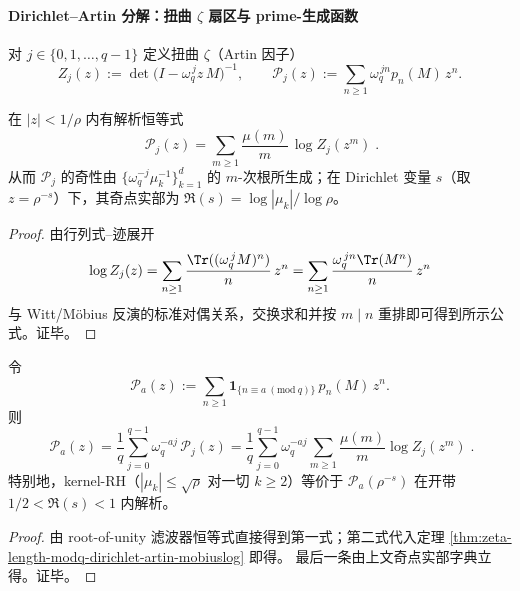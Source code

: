 \paragraph{Dirichlet--Artin 分解：扭曲 \texorpdfstring{$\zeta$}{zeta} 扇区与 prime-生成函数}
对 \(j\in\{0,1,\dots,q-1\}\) 定义扭曲 \(\zeta\)（Artin 因子）
\[
Z_j(z):=\det\bigl(I-\omega_q^{\,j}z\,M\bigr)^{-1},
\qquad
\mathcal{P}_j(z):=\sum_{n\ge1}\omega_q^{\,jn}p_n(M)\,z^n.
\]

\begin{theorem}\label{thm:zeta-length-modq-dirichlet-artin-mobiuslog}
在 \(|z|<1/\rho\) 内有解析恒等式
\[
\boxed{\;
\mathcal{P}_j(z)=\sum_{m\ge1}\frac{\mu(m)}{m}\,\log Z_j(z^m)\; }.
\]
从而 \(\mathcal{P}_j\) 的奇性由 \(\{\omega_q^{-j}\mu_k^{-1}\}_{k=1}^d\) 的 \(m\)-次根所生成；在 Dirichlet 变量 \(s\)（取 \(z=\rho^{-s}\)）下，其奇点实部为
\(
\Re(s)=\log|\mu_k|/\log\rho
\)。
\end{theorem}
\begin{proof}
由行列式--迹展开
\[
\log Z_j(z)=\sum_{n\ge1}\frac{\Tr((\omega_q^{\,j}M)^n)}{n}\,z^n
=\sum_{n\ge1}\frac{\omega_q^{\,jn}\Tr(M^n)}{n}\,z^n
\]
与 Witt/Möbius 反演的标准对偶关系，交换求和并按 \(m\mid n\) 重排即可得到所示公式。证毕。
\end{proof}

\begin{corollary}\label{cor:zeta-length-modq-artin-decomposition}
令
\[
\mathcal{P}_a(z):=\sum_{n\ge1}\mathbf 1_{\{n\equiv a\ (\mathrm{mod}\ q)\}}\,p_n(M)\,z^n.
\]
则
\[
\boxed{\;
\mathcal{P}_a(z)
=\frac{1}{q}\sum_{j=0}^{q-1}\omega_q^{-aj}\,\mathcal{P}_j(z)
=\frac{1}{q}\sum_{j=0}^{q-1}\omega_q^{-aj}\sum_{m\ge1}\frac{\mu(m)}{m}\log Z_j(z^m)\; }.
\]
特别地，kernel-RH（\(|\mu_k|\le \sqrt{\rho}\) 对一切 \(k\ge2\)）等价于 \(\mathcal{P}_a(\rho^{-s})\) 在开带 \(1/2<\Re(s)<1\) 内解析。
\end{corollary}
\begin{proof}
由 root-of-unity 滤波器恒等式直接得到第一式；第二式代入定理 \ref{thm:zeta-length-modq-dirichlet-artin-mobiuslog} 即得。
最后一条由上文奇点实部字典立得。证毕。
\end{proof}
